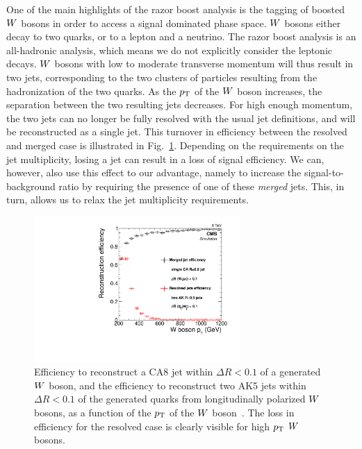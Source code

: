 
One of the main highlights of the razor boost analysis is the tagging of boosted $W$ bosons in
order to access a signal dominated phase space. 
$W$ bosons either decay to two quarks, or to a lepton and a neutrino. The razor boost analysis is
an all-hadronic analysis, which means we do not explicitly consider the leptonic decays. 
$W$ bosons with low to moderate transverse momentum will thus result in two jets, corresponding to
the two clusters of particles resulting from the hadronization of the two quarks. 
As the $p_{\mathrm{T}}$ of the $W$ boson increases, the separation between the two resulting jets decreases.
For high enough momentum, the two jets can no longer be fully resolved with the usual jet
definitions, and will be reconstructed as a single jet. This turnover in efficiency between the
resolved and merged case is illustrated in Fig.~\ref{fig:boost_wtag_ca8eff}.
Depending on the requirements on the jet multiplicity, losing a jet can result in a loss of signal
efficiency. We can, however, also use this effect to our advantage, namely to increase the
signal-to-background ratio by requiring the presence of one of these \textit{merged} jets. 
This, in turn, allows us to relax the jet multiplicity requirements. 

\begin{figure}
  \centering
  \includegraphics[width=0.7\textwidth]{figures/razor_wtag/ca8effVsPt}
  \caption{Efficiency to reconstruct a CA8 jet within $\Delta R<0.1$ of a generated $W$ boson, and
the efficiency to reconstruct two AK5 jets within $\Delta R<0.1$ of the generated quarks from
longitudinally polarized $W$ bosons, as a function of the $p_{\mathrm{T}}$ of the $W$
boson~\cite{Khachatryan:2014vla}. The loss in efficiency for the resolved case is clearly visible
for high $p_{\mathrm{T}}$ $W$ bosons. 
  \label{fig:boost_wtag_ca8eff}}
\end{figure}

